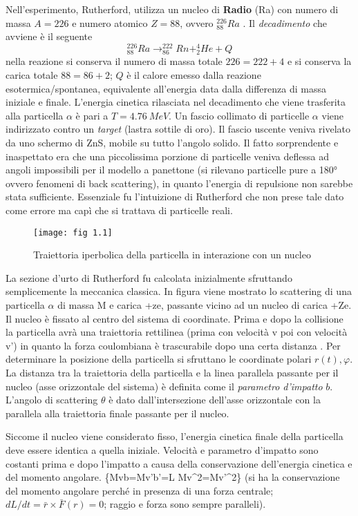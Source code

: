 Nell'esperimento, Rutherford, utilizza un nucleo di \textbf{Radio} (Ra) con numero di massa $A=226$ e numero atomico $Z=88$, ovvero $^{226}_{88} Ra$ .
Il \emph{decadimento} che avviene è il seguente
\begin{equation}
^{226}_{88} Ra \longrightarrow ^{222}_{86}Rn + ^{4}_{2}He + Q
\end{equation}
nella reazione si conserva il numero di massa totale $ 226 = 222 + 4 $ e si conserva la carica totale $ 88 = 86 + 2 $;
$Q$ è il calore emesso dalla reazione esotermica/spontanea, equivalente all'energia data dalla differenza di massa iniziale e finale. 
L'energia cinetica rilasciata nel decadimento che viene trasferita alla particella $\alpha$ è pari a $T = \SI{4.76}{MeV}$.
Un fascio collimato di particelle $\alpha$ viene indirizzato contro un \emph{target} (lastra sottile di oro).
Il fascio uscente veniva rivelato da uno schermo di ZnS, mobile su tutto l'angolo solido.
Il fatto sorprendente e inaspettato era che una piccolissima porzione di particelle veniva deflessa ad angoli impossibili per il modello a panettone (si rilevano particelle pure a 180° ovvero fenomeni di back scattering), in quanto l'energia di repulsione non sarebbe stata sufficiente.
Essenziale fu l'intuizione di Rutherford che non prese tale dato come errore ma capì che si trattava di particelle reali.
\begin{figure}[hbtp]
\centering
\texttt{[image: fig 1.1]}
\caption{Traiettoria iperbolica della particella in interazione con un nucleo}
\label{fig:1.1}
\end{figure}
La sezione d'urto di Rutherford fu calcolata inizialmente sfruttando semplicemente la meccanica classica.
In figura viene mostrato lo scattering di una particella $\alpha$ di massa M e carica +ze, passante vicino ad un nucleo di carica +Ze.
Il nucleo è fissato al centro del sistema di coordinate.
Prima e dopo la collisione la particella avrà una traiettoria rettilinea (prima con velocità v poi con velocità v') in quanto la forza coulombiana è trascurabile dopo una certa distanza .
Per determinare la posizione della particella si sfruttano le coordinate polari $r(t), \varphi$. 
La distanza tra la traiettoria della particella e la linea parallela passante per il nucleo (asse orizzontale del sistema) è definita come il \emph{parametro d'impatto} $b$.
L'angolo di scattering $\theta$ è dato dall'intersezione dell'asse orizzontale con la parallela alla traiettoria finale passante per il nucleo.

Siccome il nucleo viene considerato fisso, l'energia cinetica finale della particella deve essere identica a quella iniziale. 
Velocità e parametro d'impatto sono costanti prima e dopo l'impatto a causa della conservazione dell'energia cinetica e del momento angolare.
\{Mvb=Mv'b'=L \hspace{1cm} Mv^2=Mv'^2\}
(si ha la conservazione del momento angolare perché in presenza di una forza centrale; $dL/dt=\bar r \times \bar F (r)=0$; raggio e forza sono sempre paralleli).

